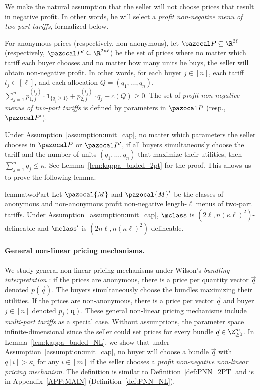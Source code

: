  We make the natural assumption that the seller will not choose prices that result in negative profit. In other words, he will select a \emph{profit non-negative menu of two-part tariffs}, formalized below.

\begin{definition}\label{def:PNN_2PT}
For anonymous prices (respectively, non-anonymous), let $\pspace \subseteq \R^{2\ell}$ (respectively, $\pspace' \subseteq \R^{2n\ell}$) be the set of prices where no matter which tariff each buyer chooses and no matter how many units he buys, the seller will obtain non-negative profit. In other words, for each buyer $j \in [n]$, each tariff $t_j \in [\ell]$, and each allocation $Q = \left(q_1, \dots, q_n\right)$, $\sum_{j = 1}^n p_{1,j}^{(t_j)} \cdot \textbf{1}_{\{q_j \geq 1\}} + p_{2,j}^{(t_j)} \cdot q_j - c\left(Q\right) \geq 0.$ The set of \emph{profit non-negative menus of two-part tariffs} is defined by parameters in $\pspace$ (resp., $\pspace'$).
\end{definition}

Under Assumption~\ref{assumption:unit_cap}, no matter which parameters the seller chooses in $\pspace$ or $\pspace'$, if all buyers simultaneously choose the tariff and the number of units $(q_1, \dots, q_n)$ that maximize their utilities, then $\sum_{j = 1}^n q_j \leq \kappa$. See Lemma~\ref{lem:kappa_bnded_2pt}  for the proof. This allows us to prove the following lemma.

\begin{restatable}{lemma}{twoPart}\label{lem:2part}
Let $\pazocal{M}$ and $\pazocal{M}'$ be the classes of anonymous and non-anonymous profit non-negative length-$\ell$ menus of two-part tariffs. Under Assumption~\ref{assumption:unit_cap}, $\mclass$ is $\left(2\ell, n\left(\kappa \ell\right)^2\right)$-delineable and $\mclass'$ is $\left(2n\ell, n\left(\kappa \ell\right)^2\right)$-delineable.
\end{restatable}


\paragraph{General non-linear pricing mechanisms.} We study general non-linear pricing mechanisms under Wilson's \emph{bundling interpretation} \citep{Wilson93:Nonlinear}: if the prices are anonymous, there is a price per quantity vector $\vec{q}$ denoted $p\left(\vec{q}\right)$. The buyers simultaneously choose the bundles maximizing their utilities. If the prices are non-anonymous, there is a price per vector $\vec{q}$ and buyer $j \in [n]$ denoted $p_j\left(\textbf{q}\right)$. These general non-linear pricing mechanisms include \emph{multi-part tariffs} as a special case.
Without assumptions, the parameter space infinite-dimensional since the seller could set prices for every bundle $\vec{q} \in \Z_{\geq 0}^m$. In Lemma~\ref{lem:kappa_bnded_NL}, we show that under Assumption~\ref{assumption:unit_cap}, no buyer will choose a bundle $\vec{q}$ with $q[i] > \kappa_i$ for any $i \in [m]$ if the seller chooses a \emph{profit non-negative non-linear pricing mechanism}. The definition is similar to Definition~\ref{def:PNN_2PT} and is in Appendix~\ref{APP:MAIN} (Definition~\ref{def:PNN_NL}).


